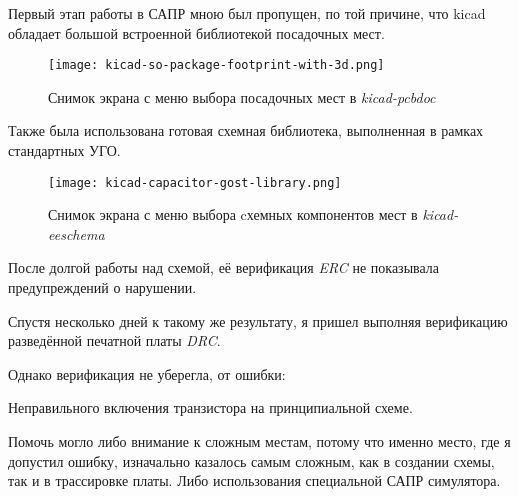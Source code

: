 Первый этап работы в САПР мною был пропущен,
по той причине, что kicad обладает большой встроенной
библиотекой посадочных мест.


\begin{figure}[H]
  \centering
  \texttt{[image: kicad-so-package-footprint-with-3d.png]}
  \caption{Снимок экрана с меню выбора посадочных мест в \textit{kicad-pcbdoc}}
\end{figure}

Также была использована готовая
схемная библиотека, выполненная в рамках стандартных УГО. 

\begin{figure}[H]
  \centering
  \texttt{[image: kicad-capacitor-gost-library.png]}
  \caption{Снимок экрана с меню выбора cхемных компонентов
    мест в \textit{kicad-eeschema}}
\end{figure}


После долгой работы над схемой, её верификация \textit{ERC}
не показывала предупреждений о нарушении.

Спустя несколько дней к такому же результату,
я пришел выполняя верификацию разведённой печатной платы \textit{DRC}.

Однако верификация не уберегла,
от ошибки:

Неправильного включения транзистора на принципиальной схеме.

Помочь могло либо внимание к сложным местам,
потому что именно место, где я допустил ошибку,
изначально казалось самым сложным, как в создании схемы,
так и в трассировке платы. Либо использования специальной САПР симулятора.

\newpage

